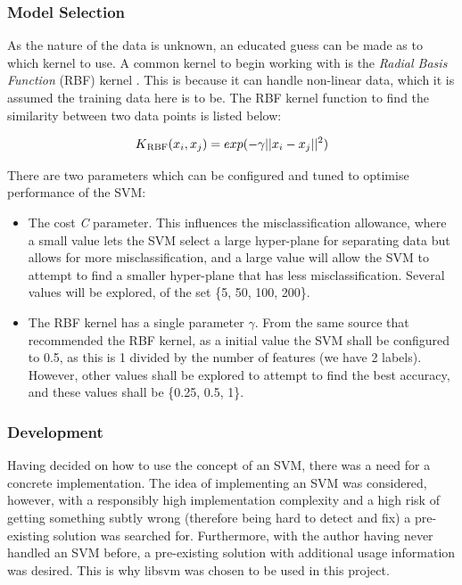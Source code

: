 \subsubsection*{Model Selection}
As the nature of the data is unknown, an educated guess can be made as to which kernel to use. A common kernel to begin working with is the \textit{Radial Basis Function} (RBF) kernel \cite{Chih-WeiHsuChih-ChungChang2008}. This is because it can handle non-linear data, which it is assumed the training data here is to be. The RBF kernel function to find the similarity between two data points is listed below:

\begin{equation*}
K\textsubscript{RBF}(x_i, x_j) = exp(-\gamma||x_i - x_j||^2)
\end{equation*}

\noindent There are two parameters which can be configured and tuned to optimise performance of the SVM:
\begin{itemize}
	\item The cost \textit{C} parameter. This influences the misclassification allowance, where a small value lets the SVM select a large hyper-plane for separating data but allows for more misclassification, and a large value will allow the SVM to attempt to find a smaller hyper-plane that has less misclassification. Several values will be explored, of the set \{5, 50, 100, 200\}.
	\item The RBF kernel has a single parameter $\gamma$. From the same source that recommended the RBF kernel, as a initial value the SVM shall be configured to 0.5, as this is 1 divided by the number of features (we have 2 labels). However, other values shall be explored to attempt to find the best accuracy, and these values shall be \{0.25, 0.5, 1\}.
\end{itemize}

\subsubsection*{Development}
Having decided on how to use the concept of an SVM, there was a need for a concrete implementation. The idea of implementing an SVM was considered, however, with a responsibly high implementation complexity and a high risk of getting something subtly wrong (therefore being hard to detect and fix) a pre-existing solution was searched for. Furthermore, with the author having never handled an SVM before, a pre-existing solution with additional usage information was desired. This is why libsvm was chosen to be used in this project.

